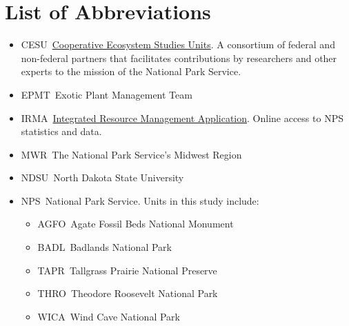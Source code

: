 \section{List of Abbreviations}

\begin{adjustwidth}{1cm}{2cm}
	
\begin{itemize}
	\item[] CESU{~}\textemdash{~}\href{https://www.nps.gov/nature/cesu.htm}{Cooperative Ecosystem Studies Units}. A consortium of federal and non-federal partners that facilitates contributions by researchers and other experts to the mission of the National Park Service. 
	\item[] EPMT{~}\textemdash{~}Exotic Plant Management Team 
	\item[] IRMA{~}\textemdash{~}\href{https://irma.nps.gov/Portal/}{Integrated Resource Management Application}. Online access to NPS statistics and data.
	\item[] MWR{~}\textemdash{~}The National Park Service's Midwest Region
	\item[] NDSU{~}\textemdash{~}North Dakota State University
	\item[] NPS{~}\textemdash{~}National Park Service. Units in this study include:
	\begin{itemize}
		\item[] AGFO{~}\textemdash{~}Agate Fossil Beds National Monument
		\item[] BADL{~}\textemdash{~}Badlands National Park
		\item[] TAPR{~}\textemdash{~}Tallgrass Prairie National Preserve
		\item[] THRO{~}\textemdash{~}Theodore Roosevelt National Park
		\item[] WICA{~}\textemdash{~}Wind Cave National Park
	\end{itemize}
\end{itemize}

\end{adjustwidth}
